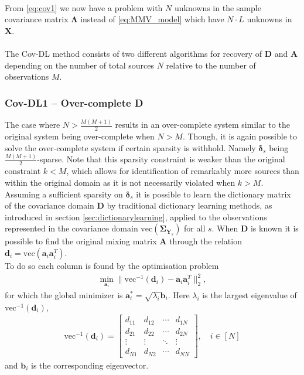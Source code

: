 \\
From \eqref{eq:cov1} we now have a problem with $N$ unknowns in the sample covariance matrix $\boldsymbol{\Lambda}$ instead of \eqref{eq:MMV_model} which have $N \cdot L$ unknowns in $\mathbf{X}$.
\\ \\
The Cov-DL method consists of two different algorithms for  recovery of $\mathbf{D}$ and $\mathbf{A}$ depending on the number of total sources $N$ relative to the number of observations $M$. 

\subsubsection*{Cov-DL1 -- Over-complete \textbf{D}}
The case where $N > \frac{M(M+1)}{2}$ results in an over-complete system similar to the original system being over-complete when $N>M$. 
Though, it is again possible to solve the over-complete system if certain sparsity is withhold. Namely $\boldsymbol{\delta}_s$ being $\frac{M(M+1)}{2}$-sparse. Note that this sparsity constraint is  weaker than the original constraint $k < M$, which allows for identification of remarkably more sources than within the original domain as it is not necessarily violated when $k > M$.
Assuming a sufficient sparsity on $\boldsymbol{\delta}_s$ it is possible to learn the dictionary matrix of the covariance domain $\mathbf{D}$ by traditional dictionary learning methods, as introduced in section \ref{sec:dictionarylearning}, applied to the observations represented in the covariance domain $\text{vec}(\boldsymbol{\Sigma}_{\mathbf{Y}_s})$ for all $s$. When $\mathbf{D}$ is known it is possible to find the original mixing matrix $\mathbf{A}$ through the relation $\mathbf{d}_i = \text{vec}(\mathbf{a}_i \mathbf{a}_i^T)$.
\\
To do so each column is found by the optimisation problem 
\begin{align*}
\min_{\textbf{a}_i} \| \text{vec}^{-1}(\textbf{d}_i) -\textbf{a}_i\textbf{a}_i^T\|_2^2, 
\end{align*}
for which the global minimizer is $\mathbf{a}^{\ast}_i=\sqrt{\lambda_i} \textbf{b}_i$. Here $\lambda_i$ is the largest eigenvalue of $\text{vec}^{-1}(\textbf{d}_i)$,
\begin{align*}
\text{vec}^{-1}(\textbf{d}_i) = 
\begin{bmatrix}
d_{11} & d_{12} & \cdots & d_{1N} \\
d_{21} & d_{22} & \cdots & d_{2N} \\
\vdots & \vdots & \ddots & \vdots \\
d_{N1} & d_{N2} & \cdots & d_{NN}
\end{bmatrix}, \quad i \in [N]
\end{align*}
and $\textbf{b}_i$ is the corresponding eigenvector.
  
